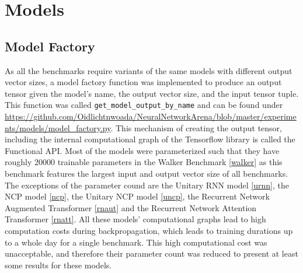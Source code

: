 \documentclass[draft,final]{vutinfth} %
\begin{document}


\chapter{Models}


\section{Model Factory}
As all the benchmarks require variants of the same models with different output vector sizes, a model factory function was implemented to produce an output tensor given the model's name, the output vector size, and the input tensor tuple.
This function was called \texttt{get\_model\_output\_by\_name} and can be found under \url{https://github.com/Oidlichtnwoada/NeuralNetworkArena/blob/master/experiments/models/model_factory.py}.
This mechanism of creating the output tensor, including the internal computational graph of the Tensorflow library \cite{Tensorflow} is called the Functional API.
Most of the models were parameterized such that they have roughly $20000$ trainable parameters in the Walker Benchmark \ref{walker} as this benchmark features the largest input and output vector size of all benchmarks.
The exceptions of the parameter cound are the Unitary RNN model \ref{urnn}, the NCP model \ref{ncp}, the Unitary NCP model \ref{uncp}, the Recurrent Network Augmented Transformer \ref{rnaut} and the Recurrent Network Attention Transformer \ref{rnatt}.
All these models' computational graphs lead to high computation costs during backpropagation, which leads to training durations up to a whole day for a single benchmark.
This high computational cost was unacceptable, and therefore their parameter count was reduced to present at least some results for these models.
\end{document}
